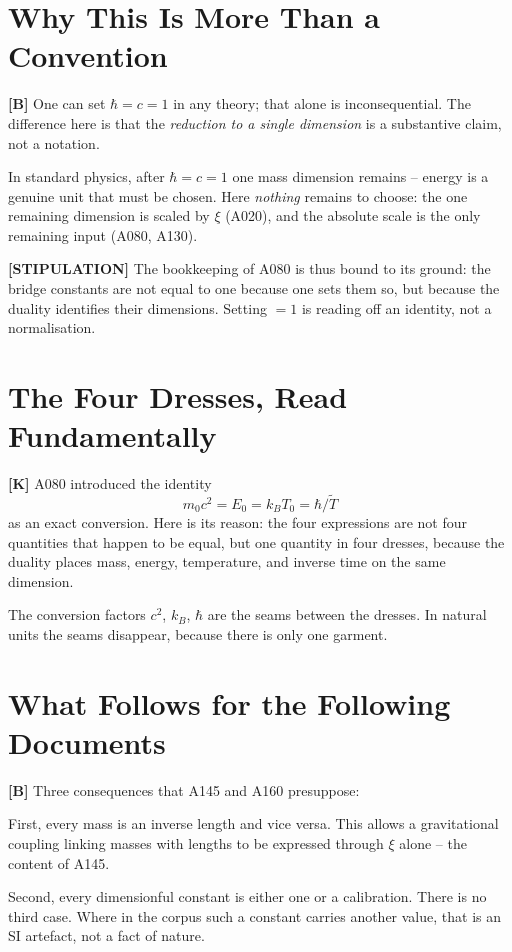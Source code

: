 \section{Why This Is More Than a Convention}

\textbf{[B]} One can set $\hbar = c = 1$ in any theory; that alone is
inconsequential. The difference here is that the \emph{reduction to a single
dimension} is a substantive claim, not a notation.

In standard physics, after $\hbar = c = 1$ one mass dimension remains -- energy
is a genuine unit that must be chosen. Here \emph{nothing} remains to choose:
the one remaining dimension is scaled by $\xi$ (A020), and the absolute scale
is the only remaining input (A080, A130).

\textbf{[STIPULATION]} The bookkeeping of A080 is thus bound to its ground:
the bridge constants are not equal to one because one sets them so, but because
the duality identifies their dimensions. Setting $=1$ is reading off an identity,
not a normalisation.

\section{The Four Dresses, Read Fundamentally}

\textbf{[K]} A080 introduced the identity
\[
  m_0 c^2 = E_0 = k_B T_0 = \hbar/\tilde T
\]
as an exact conversion. Here is its reason: the four expressions are not four
quantities that happen to be equal, but one quantity in four dresses, because
the duality places mass, energy, temperature, and inverse time on the same
dimension.

The conversion factors $c^2$, $k_B$, $\hbar$ are the seams between the dresses.
In natural units the seams disappear, because there is only one garment.

\section{What Follows for the Following Documents}

\textbf{[B]} Three consequences that A145 and A160 presuppose:

First, every mass is an inverse length and vice versa. This allows a
gravitational coupling linking masses with lengths to be expressed through $\xi$
alone -- the content of A145.

Second, every dimensionful constant is either one or a calibration. There is no
third case. Where in the corpus such a constant carries another value, that is
an SI artefact, not a fact of nature.

